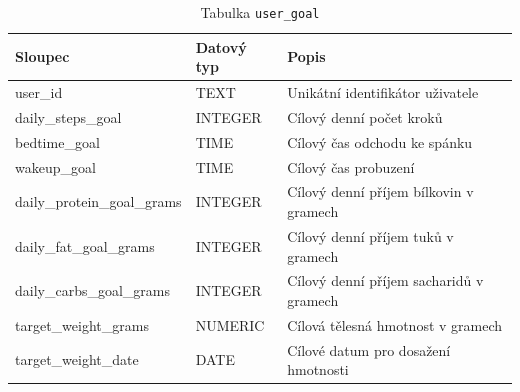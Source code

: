 \begin{table}[ht!]
    \centering
    \begin{tabularx}{\textwidth}{|l|l|L|}
        \hline
        \textbf{Sloupec}            & \textbf{Datový typ} & \textbf{Popis}                          \\ \hline
        user\_id                    & TEXT                & Unikátní identifikátor uživatele        \\ \hline
        daily\_steps\_goal          & INTEGER             & Cílový denní počet kroků                \\ \hline
        bedtime\_goal               & TIME                & Cílový čas odchodu ke spánku            \\ \hline
        wakeup\_goal                & TIME                & Cílový čas probuzení                    \\ \hline
        daily\_protein\_goal\_grams & INTEGER             & Cílový denní příjem bílkovin v gramech  \\ \hline
        daily\_fat\_goal\_grams     & INTEGER             & Cílový denní příjem tuků v gramech      \\ \hline
        daily\_carbs\_goal\_grams   & INTEGER             & Cílový denní příjem sacharidů v gramech \\ \hline
        target\_weight\_grams       & NUMERIC             & Cílová tělesná hmotnost v gramech       \\ \hline
        target\_weight\_date        & DATE                & Cílové datum pro dosažení hmotnosti     \\ \hline
    \end{tabularx}
    \caption{Tabulka \texttt{user\_goal}}
    \label{tab:user_goal}
\end{table}
